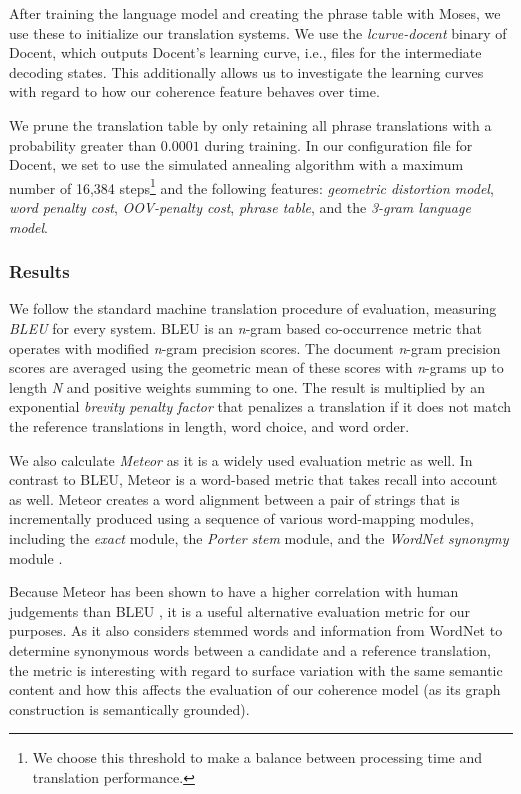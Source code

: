 After training the language model and creating the phrase table with Moses, we use these to initialize our translation systems. We use the \textit{lcurve-docent} binary of Docent, which outputs Docent's learning curve, i.e., files for the intermediate decoding states. This additionally allows us to investigate the learning curves with regard to how our coherence feature behaves over time.

We prune the translation table by only retaining all phrase translations with a probability greater than $0.0001$ during training. In our configuration file for Docent, we set to use the simulated annealing algorithm with a maximum number of 16,384 steps\footnote{We choose this threshold to make a balance between processing time and translation performance.} and the following features: \textit{geometric distortion model}, \textit{word penalty cost}, \textit{OOV-penalty cost}, \textit{phrase table}, and the \textit{3-gram language model}.

\subsubsection{Results}
We follow the standard machine translation procedure of evaluation, measuring \textit{BLEU} \cite{Papineni2002} for every system. BLEU is an \textit{n}-gram based co-occurrence metric that operates with modified \textit{n}-gram precision scores. The document \textit{n}-gram precision scores are averaged using the geometric mean of these scores with \textit{n}-grams up to length \textit{N} and positive weights 
summing to one. The result is multiplied by an exponential \textit{brevity penalty factor} that penalizes a translation if it does not match the reference translations in length, word choice, and word order.

We also calculate \textit{Meteor} \cite{Lavie2004, Denkowski2014} as it is a widely used evaluation metric as well. In contrast to BLEU, Meteor is a word-based metric that takes recall into account as well. Meteor creates a word alignment between a pair of strings that is incrementally produced using a sequence of various word-mapping modules, including the \textit{exact} module, the \textit{Porter stem} module, and the \textit{WordNet synonymy} module \cite{Lavie2007}.

Because Meteor has been shown to have a higher correlation with human judgements than BLEU \cite{Lavie2004}, it is a useful alternative evaluation metric for our purposes. As it also considers stemmed words and information from WordNet to determine synonymous words between a candidate and a reference translation, the metric is interesting with regard to surface variation with the same semantic content and how this affects the evaluation of our coherence model (as its graph construction is semantically grounded). 

